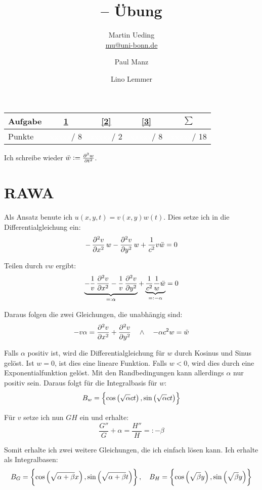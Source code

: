 \documentclass[11pt, ngerman, fleqn]{article}
\title{\themodul{} -- Übung \theuebung \\ \vspace{0.5cm} \large{\thegruppe}}
\author{Martin Ueding \\ \small{\href{mailto:mu@uni-bonn.de}{mu@uni-bonn.de}} \and Paul Manz \and Lino Lemmer}
\newcommand{\punkte}{\textcolor{white}{xxxxx}}
\begin{document}
\maketitle

\begin{table}[h]
	\centering
	\begin{tabular}{l|c|c|c|c}
		Aufgabe & \ref{1} & \ref{2} & \ref{3} & $\sum$   \\
		\hline
		Punkte & \punkte / 8 & \punkte / 2 & \punkte / 8 & \punkte / 18
	\end{tabular}
\end{table}

Ich schreibe wieder $\ddot w := \pd[2] wt$.


\section{RAWA}
\label{1}

Als Ansatz benute ich $u(x, y, t) = v(x, y) w(t)$. Dies setze ich in die Differentialgleichung ein:
\[
	- \dpd[2] vx w - \dpd[2] vy w + \frac{1}{c^2} v \ddot w = 0
\]

Teilen durch $vw$ ergibt:
\[
	\underbrace{- \frac 1v \dpd[2] vx - \frac 1v \dpd[2] vy}_{=: \alpha} + \underbrace{\frac{1}{c^2} \frac 1w \ddot w}_{=: -\alpha} = 0
\]

Daraus folgen die zwei Gleichungen, die unabhängig sind:
\[
	- v \alpha = \dpd[2] vx + \dpd[2] vy
	\quad \wedge \quad
	- \alpha c^2 w = \ddot w
\]

Falls $\alpha$ positiv ist, wird die Differentialgleichung für $w$ durch Kosinus und Sinus gelöst. Ist $w = 0$, ist dies eine lineare Funktion. Falls $w < 0$, wird dies durch eine Exponentialfunktion gelöst. Mit den Randbedingungen kann allerdings $\alpha$ nur positiv sein. Daraus folgt für die Integralbasis für $w$:
\[
	B_w = \set{
		\cos\del{\sqrt{\alpha} c t}, \sin\del{\sqrt{\alpha} c t}
	}
\]

Für $v$ setze ich nun $GH$ ein und erhalte:
\[
	\frac{G''}{G} + \alpha = \frac{H''}{H} =: - \beta
\]

Somit erhalte ich zwei weitere Gleichungen, die ich einfach lösen kann. Ich erhalte als Integralbasen:
\[
	B_G = \set{
	\cos\del{\sqrt{\alpha + \beta} x}, \sin\del{\sqrt{\alpha + \beta} t}
	}
	, \quad
	B_H = \set{
		\cos\del{\sqrt{\beta} y}, \sin\del{\sqrt{\beta} y}
	}
\]
\end{document}
